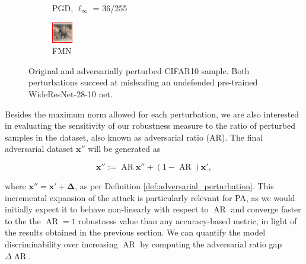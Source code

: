 \begin{figure}[H]
\begin{subfigure}[b]{0.25\textwidth}
        \caption{PGD, $\ell_\infty$ = 36/255}
    \end{subfigure}
    \hfill
    \begin{subfigure}[b]{0.25\textwidth}
        \centering
        \includegraphics[width=\textwidth]{img/results_discussion/adversarial/adv_fmn_framed.png}
        \caption{FMN}
    \end{subfigure}
    \caption{Original and adversarially perturbed CIFAR10 sample. Both perturbations succeed
    at misleading an undefended pre-trained WideResNet-28-10 net.}
\end{figure}

Besides the maximum norm allowed for each perturbation, we are also interested in evaluating 
the sensitivity of our robustness measure to the ratio of perturbed samples in the dataset, 
also known as adversarial ratio (AR). The final adversarial dataset $\bm{x}''$ will be generated as

$$
\bm{x}'' := \operatorname{AR} \bm{x}'' + (1 - \operatorname{AR}) \bm{x}',
$$

where $\bm{x}'' = \bm{x}' + \bm{\Delta}$, as per Definition \ref{def:adversarial_perturbation}.
This incremental expansion of the attack is particularly relevant for PA, as we would initially 
expect it to behave non-linearly with respect to $\operatorname{AR}$ and converge faster to
the the $\operatorname{AR}=1$ robustness value than any accuracy-based metric, in light of the results obtained
in the previous section. We can quantify the model discriminability over increasing $\operatorname{AR}$
by computing the adversarial ratio gap $\Delta \operatorname{AR}$.\\

